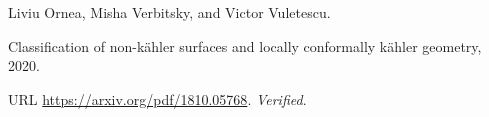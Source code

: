 Liviu Ornea, Misha Verbitsky, and Victor Vuletescu.

\newblock Classification of non-k{\"a}hler surfaces and locally conformally
  k{\"a}hler geometry, 2020.

\newblock URL \url{https://arxiv.org/pdf/1810.05768}.
\newblock \emph{Verified}.

